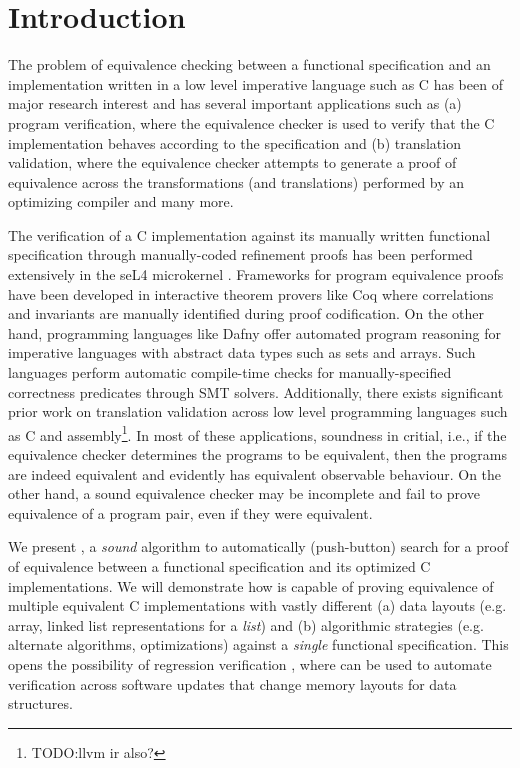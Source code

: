 \section{Introduction}
\label{sec:intro}
The problem of equivalence checking between a functional specification and an
implementation written in a low level imperative language such as C
has been of major research interest
and has several important applications such as (a) program verification, where
the equivalence checker is used to verify that the C implementation
behaves according to the specification and (b) translation validation, where
the equivalence checker attempts to generate a proof of equivalence across
the transformations (and translations) performed by an optimizing compiler
and many more.

The verification of a C implementation against its manually written
functional specification through manually-coded refinement proofs has been
performed extensively in the seL4 microkernel \cite{seL4}.
Frameworks for program equivalence proofs have been developed in interactive
theorem provers like Coq \cite{programEquivalenceInCoq} where correlations and invariants
are manually identified during proof codification.
On the other hand, programming languages like Dafny \cite{dafny} offer automated program
reasoning for imperative languages with abstract data types such as sets and arrays.
Such languages perform automatic compile-time checks for manually-specified
correctness predicates through SMT solvers.
Additionally, there exists significant prior work on translation validation
\cite{tvi,tristan_tv_eqsat11,stepp_eqsat_llvm11,eqsat,pec,zuck03,zuck05,heffter05,covac,c_to_verilog,kanade09,lopes16,tvoc_cav05,ddec,semalign,oopsla20,tv_oskernel,namjoshi13}
across low level programming languages such as C and assembly\footnote{TODO:llvm ir also?}.
In most of these applications, soundness in critial,
i.e., if the equivalence checker determines the programs to be equivalent, then the programs are indeed equivalent
and evidently has equivalent observable behaviour. On the other hand, a sound equivalence checker may be incomplete
and fail to prove equivalence of a program pair, even if they were equivalent.

We present \toolName{}, a {\em sound} algorithm to automatically (push-button) search
for a proof of equivalence between a functional specification and its
optimized C implementations. We will demonstrate how \toolName{} is capable of
proving equivalence of multiple equivalent C implementations with vastly
different (a) data layouts (e.g. array, linked list representations for a {\em list})
and (b) algorithmic strategies (e.g. alternate algorithms, optimizations) against
a {\em single} functional specification.
This opens the possibility of regression verification \cite{strichman_regressverify,felsing14},
where \toolName{} can be used to automate verification across
software updates that change memory layouts for data structures.

